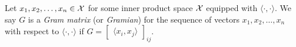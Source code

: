 Let \(x_1, x_2, \dots, x_n \in \mathcal{X}\) for some inner product space \(\mathcal{X}\) equipped with \(\langle \cdot, \cdot \rangle\).
We say \(G\) is a \textit{Gram matrix} (or \textit{Gramian}) for the sequence of vectors \(x_1, x_2, \dots, x_n\) with respect to \(\langle \cdot, \cdot \rangle\) if \(G = \begin{bmatrix}
    \langle x_i, x_j \rangle
\end{bmatrix}_{ij}\).